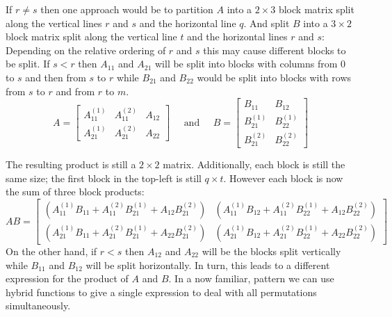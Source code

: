 If $r \neq s$ then one approach would be to partition $A$ into a $2 \times 3$ block matrix 
split along the vertical lines $r$ and $s$ and the horizontal line $q$.
And split $B$ into a $3 \times 2$ block matrix split along the vertical line $t$  and the horizontal lines $r$ and $s$:
Depending on the relative ordering of $r$ and $s$ this may cause different blocks to be split.
If $s < r$ then $A_{11}$ and $A_{21}$ will be split into blocks with columns from 0 to $s$ and then from $s$ to $r$
while $B_{21}$ and $B_{22}$ would be split into blocks with rows from $s$ to $r$ and from $r$ to $m$.
\begin{equation*}
	A= \left[ \begin{array}{cc|c}
			A_{11}^{(1)} & A_{11}^{(2)} & A_{12}^{} \\ 
			\hline
			A_{21}^{(1)} & A_{21}^{(2)} & A_{22}^{}
		\end{array} \right]
	\;\;\;\;\;\text{and}\;\;\;\;\;
	B = \left[ \begin{array}{c|c}
			B_{11}^{} & B_{12}^{} \\
			\hline
			B_{21}^{(1)} & B_{22}^{(1)} \\
			B_{21}^{(2)} & B_{22}^{(2)} 
		\end{array} \right]
\end{equation*}


The resulting product is still a $2 \times 2$ matrix.
Additionally, each block is still the same size; the first block in the top-left is still $q \times t$.
However each block is now the sum of three block products:
\begin{equation*}
	AB 	= 	\begin{bmatrix}
				\left( A_{11}^{(1)}B_{11}^{}+ A_{11}^{(2)}B_{21}^{(1)} + A_{12}^{}B_{21}^{(2)} \right) & 
				\left( A_{11}^{(1)}B_{12}^{}+ A_{11}^{(2)}B_{22}^{(1)} + A_{12}^{}B_{22}^{(2)} \right) \\
				\left( A_{21}^{(1)}B_{11}^{}+ A_{21}^{(2)}B_{21}^{(1)} + A_{22}^{}B_{21}^{(2)} \right) & 
				\left( A_{21}^{(1)}B_{12}^{}+ A_{21}^{(2)}B_{22}^{(1)} + A_{22}^{}B_{22}^{(2)} \right) 
			\end{bmatrix}
\end{equation*}
On the other hand, if $r < s$ then $A_{12}$ and $A_{22}$ will be the blocks split vertically while $B_{11}$ and $B_{12}$
will be split horizontally. 
In turn, this leads to a different expression for the product of $A$ and $B$.
In a now familiar, pattern we can use hybrid functions to give a single expression to deal with all permutations simultaneously.




